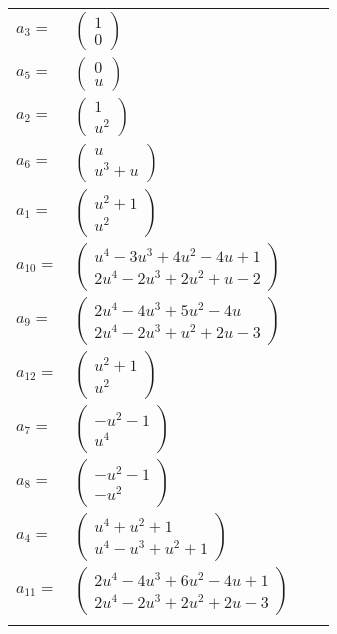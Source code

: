 \documentclass[1p]{elsarticle_modified}
\theoremstyle{definition}
\begin{document}
\begin{tabular}{m{7pt} m{180pt} m{7pt} m{180pt} }
\flushright $a_{3}=$&$\begin{pmatrix}1\\0\end{pmatrix}$ \\
\flushright $a_{5}=$&$\begin{pmatrix}0\\u\end{pmatrix}$ \\
\flushright $a_{2}=$&$\begin{pmatrix}1\\u^2\end{pmatrix}$ \\
\flushright $a_{6}=$&$\begin{pmatrix}u\\u^3+u\end{pmatrix}$ \\
\flushright $a_{1}=$&$\begin{pmatrix}u^2+1\\u^2\end{pmatrix}$ \\
\flushright $a_{10}=$&$\begin{pmatrix}u^4-3 u^3+4 u^2-4 u+1\\2 u^4-2 u^3+2 u^2+u-2\end{pmatrix}$ \\
\flushright $a_{9}=$&$\begin{pmatrix}2 u^4-4 u^3+5 u^2-4 u\\2 u^4-2 u^3+u^2+2 u-3\end{pmatrix}$ \\
\flushright $a_{12}=$&$\begin{pmatrix}u^2+1\\u^2\end{pmatrix}$ \\
\flushright $a_{7}=$&$\begin{pmatrix}- u^2-1\\u^4\end{pmatrix}$ \\
\flushright $a_{8}=$&$\begin{pmatrix}- u^2-1\\- u^2\end{pmatrix}$ \\
\flushright $a_{4}=$&$\begin{pmatrix}u^4+u^2+1\\u^4- u^3+u^2+1\end{pmatrix}$ \\
\flushright $a_{11}=$&$\begin{pmatrix}2 u^4-4 u^3+6 u^2-4 u+1\\2 u^4-2 u^3+2 u^2+2 u-3\end{pmatrix}$\\&\end{tabular}
\end{document}
